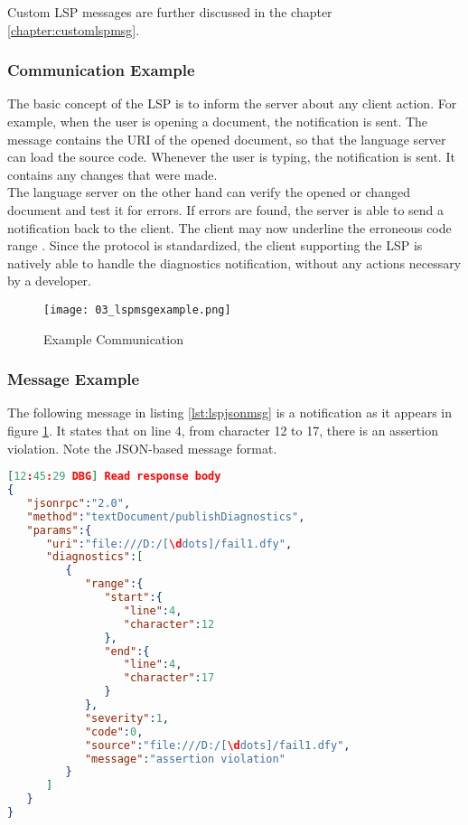 Custom LSP messages are further discussed in the chapter \ref{chapter:customlspmsg}.

\subsubsection{Communication Example}
The basic concept of the LSP is to inform the server about any client action.
For example, when the user is opening a document, the notification  is sent.
The message contains the URI of the opened document, so that the language server can load the source code.
Whenever the user is typing, the notification  is sent.
It contains any changes that were made.\\

The language server on the other hand can verify the opened or changed document and test it for errors.
If errors are found, the server is able to send a  notification back to the client.
The client may now underline the erroneous code range \cite{lspspec}.
Since the protocol is standardized, the client supporting the LSP is natively able to handle the diagnostics notification, without any actions necessary by a developer.

\begin{figure}[H]
    \centering
    \texttt{[image: 03\_lspmsgexample.png]}
    \caption{Example Communication}
    \label{fig:lspmsgexample}
\end{figure}

\subsubsection{Message Example}
The following message in listing \ref{lst:lspjsonmsg} is a  notification as it appears in figure \ref{fig:lspmsgexample}.
It states that on line 4, from character 12 to 17, there is an assertion violation.
Note the JSON-based message format.\\

\begin{lstlisting}[language=json, caption={LSP Message Example}, captionpos=b, label={lst:lspjsonmsg}]
[12:45:29 DBG] Read response body
{
   "jsonrpc":"2.0",
   "method":"textDocument/publishDiagnostics",
   "params":{
      "uri":"file:///D:/[\ddots]/fail1.dfy",
      "diagnostics":[
         {
            "range":{
               "start":{
                  "line":4,
                  "character":12
               },
               "end":{
                  "line":4,
                  "character":17
               }
            },
            "severity":1,
            "code":0,
            "source":"file:///D:/[\ddots]/fail1.dfy",
            "message":"assertion violation"
         }
      ]
   }
}
\end{lstlisting}

